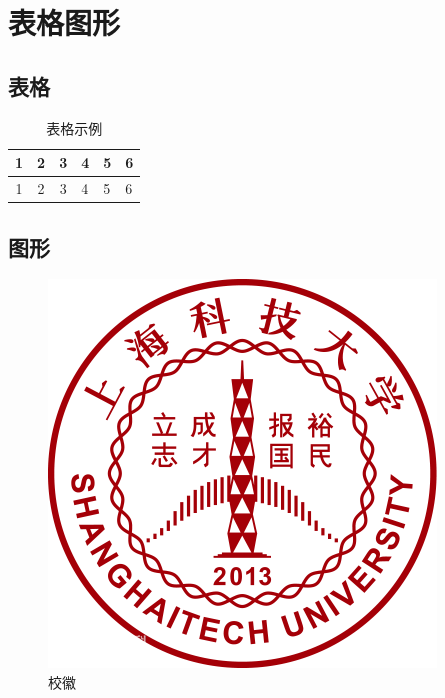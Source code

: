 \chapter{表格图形}\label{sec:tabfig}

\section{表格}
\begin{table}[htbp]
    \caption{表格示例}\label{tab:dem}
    \begin{center}
       \begin{tabular}{|ccclll|}
        \hline
       1 & 2 & 3 & 4 & 5 & 6\\
       \hline
       1 & 2 & 3 & 4 & 5 & 6\\
       \hline
       \end{tabular}
    \end{center}
\end{table}
\section{图形}
\begin{figure}[htbp]
    \begin{center}
        \includegraphics[width=0.3\linewidth]{logo.jpg}
    \end{center}
    \caption[图形示例]{校徽}
\end{figure}